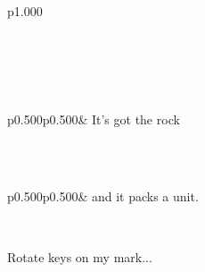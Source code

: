 \label{Ocamlary--module-ExtMod}\label{Ocamlary-ExtMod}\begin{ocamlindent}\label{Ocamlary-ExtMod--type-t}\\
\label{Ocamlary-ExtMod--extension-decl-Leisureforce}\\
\begin{ocamltabular}{p{1.000\textwidth}}\label{Ocamlary-ExtMod--extension-Leisureforce}\\
\end{ocamltabular}%
\\
\end{ocamlindent}%
\\
\label{Ocamlary--extension-decl-ZzzTop0}\\
\begin{ocamltabular}{p{0.500\textwidth}p{0.500\textwidth}}\label{Ocamlary--extension-ZzzTop0}& It's got the rock\\
\end{ocamltabular}%
\\
\label{Ocamlary--extension-decl-ZzzTop}\\
\begin{ocamltabular}{p{0.500\textwidth}p{0.500\textwidth}}\label{Ocamlary--extension-ZzzTop}& and it packs a unit.\\
\end{ocamltabular}%
\\
\label{Ocamlary--val-launch_missiles}\begin{ocamlindent}Rotate keys on my mark...\end{ocamlindent}%
